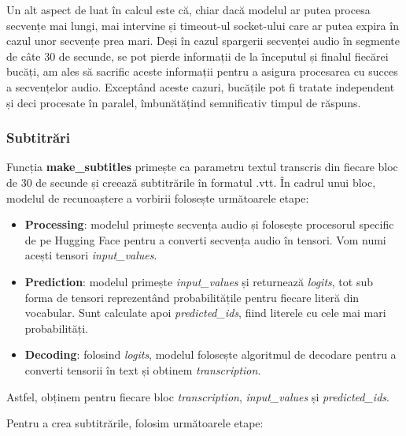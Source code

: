 \par
Un alt aspect de luat în calcul este că, chiar dacă modelul ar putea procesa secvențe mai lungi, mai
intervine și timeout-ul socket-ului care ar putea expira în cazul unor secvențe prea mari. Deși în
cazul spargerii secvenței audio în segmente de câte 30 de secunde, se pot pierde informații de 
la începutul și finalul fiecărei bucăți, am ales să sacrific aceste informații pentru a asigura
procesarea cu succes a secvențelor audio. Exceptând aceste cazuri, bucățile pot fi tratate independent
și deci procesate în paralel, îmbunătățind semnificativ timpul de răspuns.

\subsubsection{Subtitrări}
\label{subsec:subtitles}
\par
Funcția \textbf{make\_subtitles} primește ca parametru textul transcris din fiecare bloc de 30 de secunde
și creează subtitrările în formatul .vtt. În cadrul unui bloc, modelul de recunoaștere a vorbirii 
folosește următoarele etape:
\begin{itemize}
    \item \textbf{Processing}: modelul primește secvența audio și folosește procesorul specific de pe
    Hugging Face pentru a converti secvența audio în tensori. Vom numi acești tensori \textit{input\_values}.
    \item \textbf{Prediction}: modelul primește \textit{input\_values} și returnează \textit{logits}, tot
    sub forma de tensori reprezentând probabilitățile pentru fiecare literă din vocabular. Sunt calculate
    apoi \textit{predicted\_ids}, fiind literele cu cele mai mari probabilități.
    \item \textbf{Decoding}: folosind \textit{logits}, modelul folosește algoritmul de decodare pentru a
    converti tensorii în text și obtinem \textit{transcription}.
\end{itemize}

Astfel, obținem pentru fiecare bloc \textit{transcription}, \textit{input\_values} și \textit{predicted\_ids}.

\par
Pentru a crea subtitrările, folosim următoarele etape:

